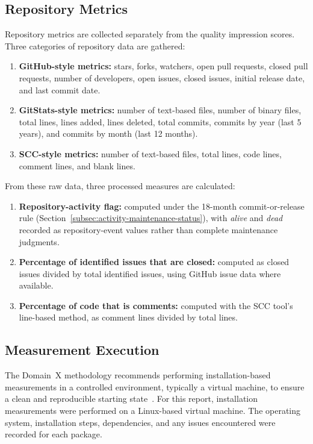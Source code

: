 \subsection{Repository Metrics}
\label{subsec:repository-metrics}

Repository metrics are collected separately from the quality impression scores. Three categories of repository data are gathered:

\begin{enumerate}
    \item \textbf{GitHub-style metrics:} stars, forks, watchers, open pull requests, closed pull requests, number of developers, open issues, closed issues, initial release date, and last commit date.
    \item \textbf{GitStats-style metrics:} number of text-based files, number of binary files, total lines, lines added, lines deleted, total commits, commits by year (last 5 years), and commits by month (last 12 months).
    \item \textbf{SCC-style metrics:} number of text-based files, total lines, code lines, comment lines, and blank lines.
\end{enumerate}

From these raw data, three processed measures are calculated:

\begin{enumerate}
    \item \textbf{Repository-activity flag:} computed under the 18-month commit-or-release rule (Section~\ref{subsec:activity-maintenance-status}), with \emph{alive} and \emph{dead} recorded as repository-event values rather than complete maintenance judgments.
    \item \textbf{Percentage of identified issues that are closed:} computed as closed issues divided by total identified issues, using GitHub issue data where available.
    \item \textbf{Percentage of code that is comments:} computed with the SCC tool's line-based method, as comment lines divided by total lines.
\end{enumerate}

\subsection{Measurement Execution}
\label{subsec:measurement-execution}

The Domain~X methodology recommends performing installation-based measurements in a controlled environment, typically a virtual machine, to ensure a clean and reproducible starting state~\citep{Smith2021}. For this report, installation measurements were performed on a Linux-based virtual machine. The operating system, installation steps, dependencies, and any issues encountered were recorded for each package.

